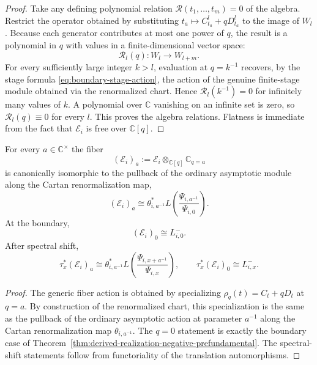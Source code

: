 \begin{proof}
Take any defining polynomial relation
$\mathscr R(t_1,\dots,t_m)=0$ of the algebra. Restrict the operator
obtained by substituting $t_a\mapsto C_{t_a}^l+qD_{t_a}^l$ to the image of
$W_l$. Because each generator contributes at most one power of $q$, the
result is a polynomial in $q$ with values in a finite-dimensional vector
space:
\begin{equation}
\mathscr R_l(q):W_l\longrightarrow W_{l+m}.
\end{equation}
For every sufficiently large integer $k>l$, evaluation at $q=k^{-1}$
recovers, by the stage formula \eqref{eq:boundary-stage-action}, the
action of the genuine finite-stage module obtained via the renormalized
chart. Hence $\mathscr R_l(k^{-1})=0$ for infinitely
many values of $k$. A polynomial over $\mathbb C$ vanishing on an
infinite set is zero, so $\mathscr R_l(q)\equiv 0$ for every $l$. This
proves the algebra relations. Flatness is immediate from the fact that
$\mathcal E_i$ is free over $\mathbb C[q]$.
\end{proof}

\begin{theorem}
\ClaimStatusProvedHere
\label{thm:generic-and-boundary-fibers}
For every $a\in \mathbb C^\times$ the fiber
\begin{equation}
(\mathcal E_i)_a:=\mathcal E_i\otimes_{\mathbb C[q]}\mathbb C_{q=a}
\end{equation}
is canonically isomorphic to the pullback of the ordinary asymptotic
module along the Cartan renormalization map,
\begin{equation}
(\mathcal E_i)_a
\cong
\theta_{i,a^{-1}}^*L\!\left(\frac{\Psi_{i,a^{-1}}}{\Psi_{i,0}}\right).
\end{equation}
At the boundary,
\begin{equation}
(\mathcal E_i)_0\cong L^-_{i,0}.
\end{equation}
After spectral shift,
\begin{equation}
\tau_x^*(\mathcal E_i)_a
\cong
\theta_{i,a^{-1}}^*L\!\left(\frac{\Psi_{i,x+a^{-1}}}{\Psi_{i,x}}\right),
\qquad
\tau_x^*(\mathcal E_i)_0\cong L^-_{i,x}.
\end{equation}
\end{theorem}

\begin{proof}
The generic fiber action is obtained by specializing
$\rho_q(t)=C_t+qD_t$ at $q=a$. By construction of the renormalized chart,
this specialization is the same as the pullback of the ordinary
asymptotic action at parameter $a^{-1}$ along the Cartan renormalization
map $\theta_{i,a^{-1}}$. The $q=0$ statement is exactly the boundary case
of Theorem~\ref{thm:derived-realization-negative-prefundamental}. The
spectral-shift statements follow from functoriality of the translation
automorphisms.
\end{proof}

